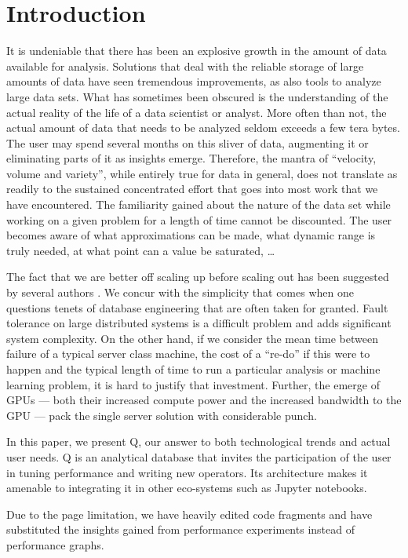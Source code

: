 \section{Introduction}

It is undeniable that there has been an explosive growth in the 
amount of data available for analysis. Solutions that 
deal with the reliable storage of large amounts of data have seen tremendous
improvements, as also tools to analyze large data sets. What has sometimes been
obscured is the understanding of the actual reality of the life of a data
scientist or analyst. More often than not, the actual amount of data that needs
to be analyzed seldom exceeds a few tera bytes\cite{Dittrich2015}. The user may spend
several months on this sliver of data, augmenting it or eliminating parts of it
as insights emerge. Therefore, the mantra of ``velocity, volume and variety'',
while entirely true for data in general, does not translate as readily to the
sustained concentrated effort that goes into most work that we have
encountered. The familiarity gained about the nature of the data set 
while working on a given problem for a length of time cannot be discounted. The
user becomes aware of what approximations can be made, what dynamic range is
truly needed, at what point can a value be saturated, \ldots

The fact that we are better off scaling up before scaling out has been suggested
by several authors \cite{Rowstron2012,Dittrich2015}. We concur with the simplicity
that comes when one questions tenets of database engineering that are often
taken for granted. Fault tolerance on large distributed systems is a difficult
problem and adds significant system complexity. On the other hand, if we
consider the mean time between failure of a typical server class machine, the
cost of a ``re-do'' if this were to happen and the typical length of time to run
a particular analysis or machine learning problem, it is hard to justify that
investment. 
Further, the emerge of GPUs --- both their increased compute power and the
increased  bandwidth to the GPU --- pack the single server solution with
considerable punch.

In this paper, we present Q, our answer to both technological trends and actual
user needs. Q is an analytical database that invites the participation of the
user in tuning performance and writing new operators. Its architecture makes it
amenable to integrating it in other eco-systems such as Jupyter notebooks.

Due to the page limitation, we have heavily edited code fragments and
have substituted the insights gained from performance experiments instead of
performance graphs.
